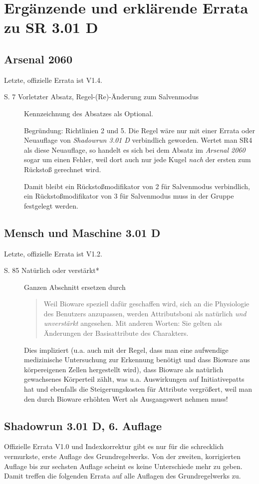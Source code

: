 \documentclass[a4paper]{scrartcl}
\newcommand{\errata}[1]{Letzte, offizielle Errata ist V#1.}
\begin{document}
\section{Ergänzende und erklärende Errata zu SR 3.01 D}
\subsection{Arsenal 2060}
\errata{1.4}
\begin{description}
 \item[S. 7 Vorletzter Absatz, Regel-(Re)-Änderung zum Salvenmodus] Kennzeichnung des Absatzes als Optional.
 
 Begründung: Richtlinien 2 und 5. Die Regel wäre nur mit einer Errata oder Neuauflage von \textit{Shadowrun 3.01 D} verbindlich geworden. Wertet man SR4 als diese Neuauflage, so handelt es sich bei dem Absatz im \textit{Arsenal 2060} sogar um einen Fehler, weil dort auch nur jede Kugel \textit{nach} der ersten zum Rückstoß gerechnet wird.
 
 Damit bleibt ein Rückstoßmodifikator von 2 für Salvenmodus verbindlich, ein Rückstoßmodifikator von 3 für Salvenmodus muss in der Gruppe festgelegt werden.
\end{description}

\subsection{Mensch und Maschine 3.01 D}
\errata{1.2}
\begin{description}
 \item[S. 85 Natürlich oder verstärkt*] Ganzen Abschnitt ersetzen durch
 \begin{quote}
  \glqq Weil Bioware speziell dafür geschaffen wird, sich an die Physiologie des Benutzers anzupassen, werden Attributsboni als natürlich \textit{und unverstärkt} angesehen. Mit anderen Worten: Sie gelten als Änderungen der Basisattribute des Charakters.\grqq
 \end{quote}
 Dies impliziert (u.a. auch mit der Regel, dass man eine aufwendige medizinische Untersuchung zur Erkennung benötigt und dass Bioware aus körpereigenen Zellen hergestellt wird), dass Bioware als natürlich gewachsenes Körperteil zählt, was u.a. Auswirkungen auf Initiativepatts hat und ebenfalls die Steigerungskosten für Attribute vergrößert, weil man den durch Bioware erhöhten Wert als Ausgangswert nehmen muss!
\end{description}

\subsection{Shadowrun 3.01 D, 6. Auflage}
Offizielle Errata V1.0 und Indexkorrektur gibt es nur für die schrecklich vermurkste, erste Auflage des Grundregelwerks. Von der zweiten, korrigierten Auflage bis zur sechsten Auflage scheint es keine Unterschiede mehr zu geben. Damit treffen die folgenden Errata auf alle Auflagen des Grundregelwerks zu.
\end{document}

